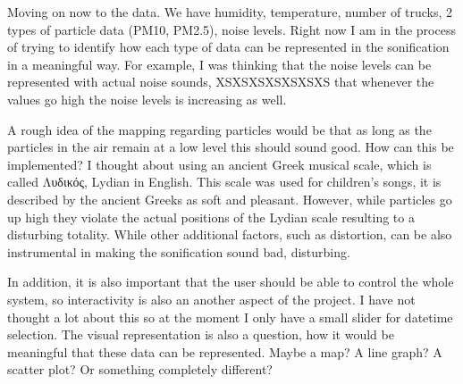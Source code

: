 \documentclass[11pt]{article}
\begin{document}
Moving on now to the data.  We have humidity, temperature, number of trucks, 2 types of particle data (PM10, PM2.5), noise levels.  Right now I am in the process of trying to identify how each type of data can be represented in the sonification in a meaningful way.  For example, I was thinking that the noise levels can be represented with actual noise sounds, XSXSXSXSXSXSXS that whenever the values go high the noise levels is increasing as well.

A rough idea of the mapping regarding particles would be that as long as the particles in the air remain at a low level this should sound good.  How can this be implemented?  I thought about using an ancient Greek musical scale, which is called Λυδικός, Lydian in English.  This scale was used for children's songs, it is described by the ancient Greeks as soft and pleasant.  However, while particles go up high they violate the actual positions of the Lydian scale resulting to a disturbing totality.  While other additional factors, such as distortion, can be also instrumental in making the sonification sound bad, disturbing.

In addition, it is also important that the user should be able to control the whole system, so interactivity is also an another aspect of the project.  I have not thought a lot about this so at the moment I only have a small slider for datetime selection.  The visual representation is also a question, how it would be meaningful that these data can be represented.  Maybe a map?  A line graph?  A scatter plot? Or something completely different?
\end{document}

